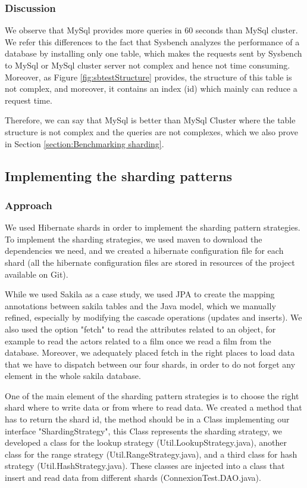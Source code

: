 \documentclass[10pt, conference]{IEEEtran}
\begin{document}
\subsubsection{Discussion} We observe that MySql provides more queries in 60 seconds than MySql cluster. We refer this differences to the fact that Sysbench analyzes the performance of a database by installing only one table, which makes the requests sent by Sysbench to MySql or MySql cluster server not complex and hence not time consuming. Moreover, as Figure \ref{fig:sbtestStructure} provides, the structure of this table is not complex, and moreover, it contains an index (id) which mainly can reduce a request time.

Therefore, we can say that MySql is better than MySql Cluster where the table structure is not complex and the queries are not complexes, which we also prove in Section \ref{section:Benchmarking sharding}.

\subsection{Implementing the sharding patterns}

\subsubsection{Approach} We used Hibernate shards in order to implement the sharding pattern strategies. To implement the sharding strategies, we used maven to download the dependencies we need, and we created a hibernate configuration file for each shard (all the hibernate configuration files are stored in resources of the project available on Git). 

While we used Sakila as a case study, we used JPA to create the mapping annotations between sakila tables and the Java model, which we manually refined, especially by modifying the cascade operations (updates and inserts). We also used the option "fetch" to read the attributes related to an object, for example to read the actors related to a film once we read a film from the database. Moreover, we adequately placed fetch in the right places to load data that we have to dispatch between our four shards, in order to do not forget any element in the whole sakila database. 

One of the main element of the sharding pattern strategies is to choose the right shard where to write data or from where to read data. We created a method that has to return the shard id, the method should be in a Class implementing our interface "ShardingStrategy", this Class represents the sharding strategy, we developed a class for the lookup strategy (Util.LookupStrategy.java), another class for the range strategy (Util.RangeStrategy.java), and a third class for hash strategy (Util.HashStrategy.java). These classes are injected into a class that insert and read data from different shards (ConnexionTest.DAO.java).
\end{document}
